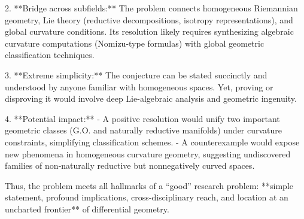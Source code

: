 2. **Bridge across subfields:** The problem connects homogeneous Riemannian geometry, Lie theory (reductive decompositions, isotropy representations), and global curvature conditions. Its resolution likely requires synthesizing algebraic curvature computations (Nomizu-type formulas) with global geometric classification techniques.

3. **Extreme simplicity:** The conjecture can be stated succinctly and understood by anyone familiar with homogeneous spaces. Yet, proving or disproving it would involve deep Lie-algebraic analysis and geometric ingenuity.

4. **Potential impact:**  
   - A positive resolution would unify two important geometric classes (G.O. and naturally reductive manifolds) under curvature constraints, simplifying classification schemes.  
   - A counterexample would expose new phenomena in homogeneous curvature geometry, suggesting undiscovered families of non‑naturally reductive but nonnegatively curved spaces.

Thus, the problem meets all hallmarks of a “good” research problem: **simple statement, profound implications, cross‑disciplinary reach, and location at an uncharted frontier** of differential geometry.